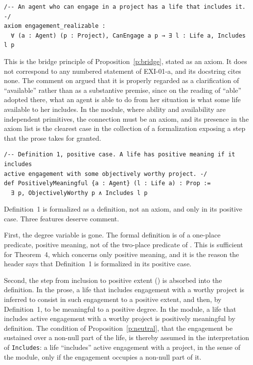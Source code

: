 \begin{lstlisting}
/-- An agent who can engage in a project has a life that includes it. -/
axiom engagement_realizable :
  ∀ (a : Agent) (p : Project), CanEngage a p → ∃ l : Life a, Includes l p
\end{lstlisting}

This is the bridge principle of Proposition~\ref{p:bridge}, stated as an axiom. It does not correspond to any numbered statement of EXI-01-a, and its docstring cites none. The comment on  argued that it is properly regarded as a clarification of \enquote{available} rather than as a substantive premise, since on the reading of \enquote{able} adopted there, what an agent is able to do from her situation is what some life available to her includes. In the module, where ability and availability are independent primitives, the connection must be an axiom, and its presence in the axiom list is the clearest case in the collection of a formalization exposing a step that the prose takes for granted.

\begin{lstlisting}
/-- Definition 1, positive case. A life has positive meaning if it includes
active engagement with some objectively worthy project. -/
def PositivelyMeaningful {a : Agent} (l : Life a) : Prop :=
  ∃ p, ObjectivelyWorthy p ∧ Includes l p
\end{lstlisting}

Definition~1 is formalized as a definition, not an axiom, and only in its positive case. Three features deserve comment.

First, the degree variable is gone. The formal definition is of a one-place predicate, positive meaning, not of the two-place predicate of . This is sufficient for Theorem~4, which concerns only positive meaning, and it is the reason the header says that Definition~1 is formalized in its positive case.

Second, the step from inclusion to positive extent () is absorbed into the definition. In the prose, a life that includes engagement with a worthy project is inferred to consist in such engagement to a positive extent, and then, by Definition~1, to be meaningful to a positive degree. In the module, a life that includes active engagement with a worthy project is positively meaningful by definition. The condition of Proposition~\ref{p:neutral}, that the engagement be sustained over a non-null part of the life, is thereby assumed in the interpretation of \texttt{Includes}: a life \enquote{includes} active engagement with a project, in the sense of the module, only if the engagement occupies a non-null part of it.

